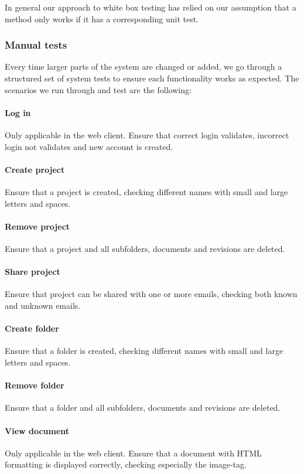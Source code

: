 In general our approach to white box testing has relied on our assumption that a method only works if it has a corresponding unit test.

\subsubsection{Manual tests}
Every time larger parts of the system are changed or added, we go through a structured set of system tests to ensure each functionality works as expected. The scenarios we run through and test are the following:

	\paragraph{Log in}
	Only applicable in the web client. Ensure that correct login validates, incorrect login not validates and new account is created.

	\paragraph{Create project}
	Ensure that a project is created, checking different names with small and large letters and spaces.

	\paragraph{Remove project}
	Ensure that a project and all subfolders, documents and revisions are deleted.

	\paragraph{Share project}
	Ensure that project can be shared with one or more emails, checking both known and unknown emails.

	\paragraph{Create folder}
	Ensure that a folder is created, checking different names with small and large letters and spaces.

	\paragraph{Remove folder}
	Ensure that a folder and all subfolders, documents and revisions are deleted.

	\paragraph{View document}
	Only applicable in the web client. Ensure that a document with HTML formatting is displayed correctly, checking especially the image-tag.

